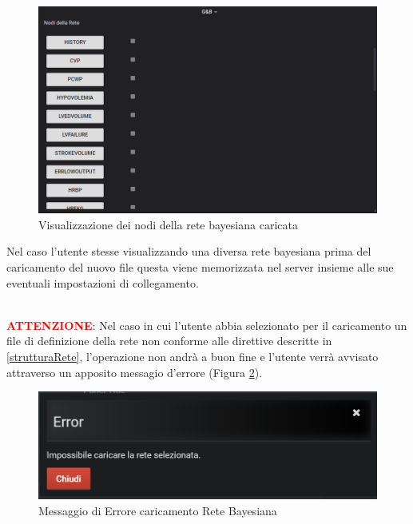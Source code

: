 \begin{figure}[H]
	\begin{center}
		\includegraphics[scale=0.6]{./images/NodiRete.png}
		 \caption{Visualizzazione dei nodi della rete bayesiana caricata}	
		 \label{NodiRete}
	\end{center}
\end{figure}

Nel caso l'utente stesse visualizzando una diversa rete bayesiana prima del caricamento del nuovo file questa viene memorizzata nel server insieme alle sue eventuali impostazioni di collegamento.

~\\
\textbf{\textcolor{red}{ATTENZIONE}}: Nel caso in cui l'utente abbia selezionato per il caricamento un file di definizione della rete non conforme alle direttive descritte in \ref{strutturaRete}, l'operazione non andrà a buon fine e l'utente verrà avvisato attraverso un apposito messagio d'errore (Figura \ref{ErroreUpRete}).

\begin{figure}[H]
	\begin{center}
		\includegraphics[scale=0.6]{./images/ErroreUpRete.png}
		 \caption{Messaggio di Errore caricamento Rete Bayesiana}	
		 \label{ErroreUpRete}
	\end{center}
\end{figure}

